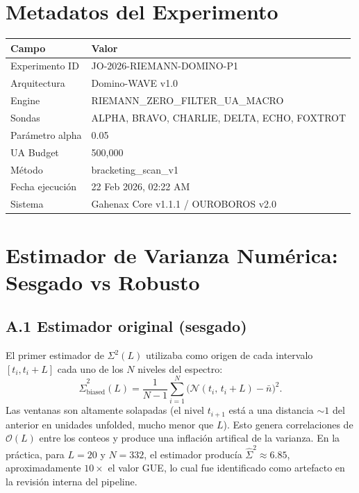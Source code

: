 \documentclass[12pt, a4paper]{article}
\begin{document}
\section*{Metadatos del Experimento}

\begin{table}[H]
\centering
\begin{tabular}{ll}
\toprule
\textbf{Campo} & \textbf{Valor} \\
\midrule
Experimento ID   & JO-2026-RIEMANN-DOMINO-P1 \\
Arquitectura     & Domino-WAVE v1.0 \\
Engine           & RIEMANN\_ZERO\_FILTER\_UA\_MACRO \\
Sondas           & ALPHA, BRAVO, CHARLIE, DELTA, ECHO, FOXTROT \\
Parámetro alpha  & 0.05 \\
UA Budget        & 500,000 \\
Método           & bracketing\_scan\_v1 \\
Fecha ejecución  & 22 Feb 2026, 02:22 AM \\
Sistema          & Gahenax Core v1.1.1 / OUROBOROS v2.0 \\
\bottomrule
\end{tabular}
\end{table}

\appendix
\section{Estimador de Varianza Numérica: Sesgado vs Robusto}
\label{app:estimador}

\subsection*{A.1 Estimador original (sesgado)}

El primer estimador de $\Sigma^2(L)$ utilizaba como origen de cada
intervalo $[t_i, t_i + L]$ cada uno de los $N$ niveles del espectro:
\[
  \hat{\Sigma}^2_\text{biased}(L)
    = \frac{1}{N-1}\sum_{i=1}^{N}\bigl(\mathcal{N}(t_i,\,t_i+L) - \bar{n}\bigr)^2.
\]
Las ventanas son altamente solapadas (el nivel $t_{i+1}$ está a una
distancia $\sim 1$ del anterior en unidades unfolded, mucho menor que $L$).
Esto genera correlaciones de $\mathcal{O}(L)$ entre los conteos y produce
una inflación artifical de la varianza. En la práctica, para $L = 20$
y $N = 332$, el estimador producía $\hat{\Sigma}^2 \approx 6.85$,
aproximadamente $10\times$ el valor GUE, lo cual fue identificado como
artefacto en la revisión interna del pipeline.
\end{document}
